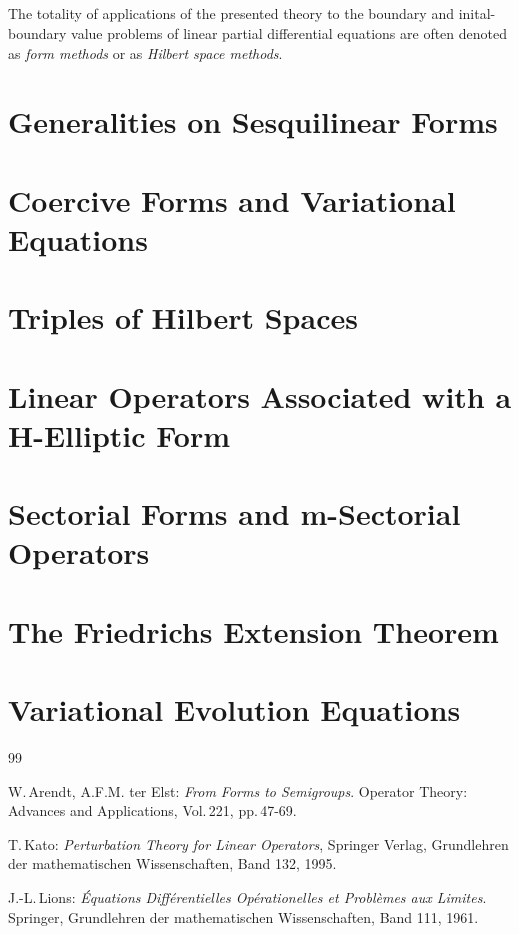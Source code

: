 \documentclass[11pt,twoside]{article}
\begin{document}
\subparagraph{}
The totality of applications of the presented theory
to the boundary and inital-boundary value problems
of linear partial differential equations
are often denoted as \textit{form methods} or as \textit{Hilbert space methods}.

\section{Generalities on Sesquilinear Forms}
\section{Coercive Forms and Variational Equations}
\section{Triples of Hilbert Spaces}
\section{Linear Operators Associated with a H-Elliptic Form}
\section{Sectorial Forms and m-Sectorial Operators}
\section{The Friedrichs Extension Theorem}
\section{Variational Evolution Equations}

\vspace{5mm}
\begin{thebibliography}{99}
\begin{small}

 W.\,Arendt, A.F.M. ter Elst:
\textit{From Forms to Semigroups}.
Operator Theory: Advances and Applications, Vol.\,221, pp.\,47-69.

 T.\,Kato:
\textit{Perturbation Theory for Linear Operators}, Springer Verlag,
Grundlehren der mathematischen Wissenschaften, Band 132, 1995.

 J.-L.\,Lions:
\textit{\'{E}quations Diff\'{e}rentielles Op\'{e}rationelles et Probl\`{e}mes aux Limites}.
Springer,
Grund\-lehren der mathematischen Wissenschaften, Band 111, 1961.

\end{small}
\end{thebibliography}
\end{document}
